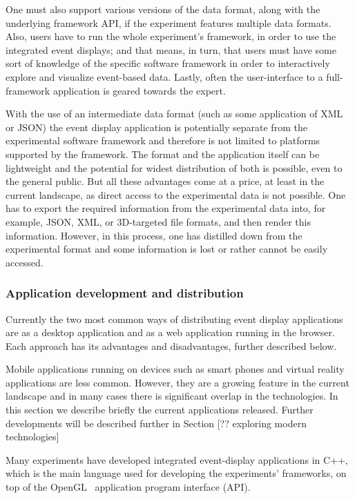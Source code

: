 \documentclass[12pt,a4paper]{article}
\begin{document}
One must also support various versions of the data format, along with the underlying framework API, if the experiment
features multiple data formats. Also, users have to run the whole experiment’s framework, in order to use the integrated event
displays; and that means, in turn, that users must have some sort of knowledge of the specific software framework in order
to interactively explore and visualize event-based data. Lastly, often the user-interface to a full-framework application
is geared towards the expert.

With the use of an intermediate data format (such as some application of XML or JSON) the event display application
is potentially separate from the experimental software framework and therefore is not limited to platforms supported
by the framework. The format and the application itself can be lightweight and the potential for widest distribution
of both is possible, even to the general public. But all these advantages come at a price, at least in the current landscape,
as direct access to the experimental data is not possible. One has to export the required information from the experimental
data into, for example, JSON, XML, or 3D-targeted file formats, and then render this information. However, in this process,
one has distilled down from the experimental format and some information is lost or rather cannot be easily accessed.

\hypertarget{application-development}{%
\subsubsection{Application development and distribution}\label{application-development}}

Currently the two most common ways of distributing event display applications are as a desktop application and as a web
application running in the browser. Each approach has its advantages and disadvantages, further described below.

Mobile applications running on devices such as smart phones and virtual reality applications are less common. However,
they are a growing feature in the current landscape and in many cases there is significant overlap in the technologies.
In this section we describe briefly the current applications released. Further developments will be described further in
Section [?? exploring modern technologies]

Many experiments have developed integrated event-display applications in C++, which is the main language used for developing
the experiments’ frameworks, on top of the OpenGL~\cite{OpenGL1992} application program interface (API).
\end{document}
